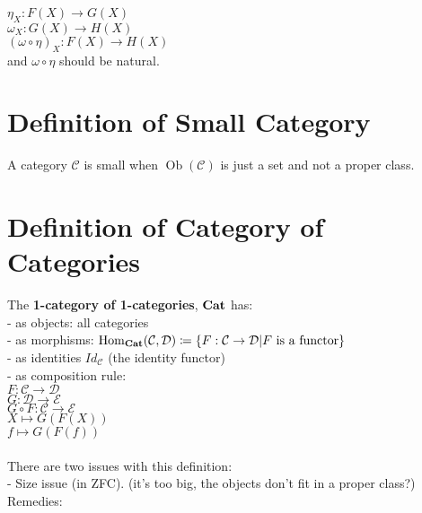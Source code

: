 \documentclass[a4paper, twoside, english, 11pt]{book}
\newcommand{\braces}[1] {\left \{ #1 \right \}}
\DeclareMathOperator{\Hom}{Hom}
\DeclareMathOperator{\Ob}{Ob}
\newcommand{\C}{\mathcal C}
\newcommand{\D}{\mathcal D}
\newcommand{\E}{\mathcal E}
\newcommand{\catname}[1]{{\normalfont\textbf{#1}}}
\newcommand{\Cat}{\catname{Cat}}
\begin{document}
\indent\indent
$\eta_X : F(X) \rightarrow G(X)$ \\
\indent\indent
$\omega_X : G(X) \rightarrow H(X)$ \\
\indent\indent
$(\omega \circ \eta)_X : F(X) \rightarrow H(X)$ \\

and $\omega \circ \eta$ should be natural.



\section{Definition of Small Category}

A category $\C$ is small when $\Ob(\C)$ is just a set and not a proper class.



\section{Definition of Category of Categories}

The \textbf{1-category of 1-categories}, $\Cat$ has: \\

- as objects: all categories \\

- as morphisms: $\Hom_\Cat(\C, \D) \coloneqq \braces{F : \C \rightarrow \D | F \text{ is a functor}}$ \\

- as identities $Id_\C$ (the identity functor) \\

- as composition rule: \\
\indent\indent
$F : \C \rightarrow \D$ \\
\indent\indent
$G : \D \rightarrow \E$ \\

\indent\indent
$G \circ F : \C \rightarrow \E$ \\
\indent\indent
$X \mapsto G(F(X))$ \\
\indent\indent
$f \mapsto G(F(f))$ \\\\

\noindent
There are two issues with this definition: \\

- Size issue (in ZFC). (it's too big, the objects don't fit in a proper class?) \\
\indent\indent
Remedies: \\
\end{document}
